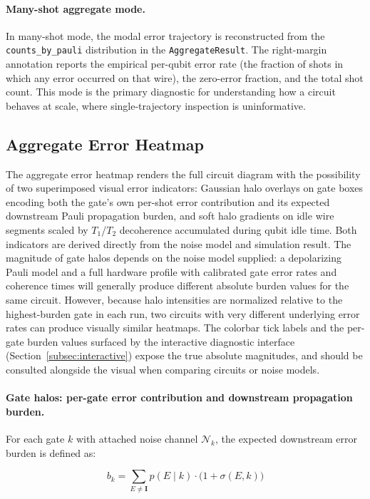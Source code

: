 \documentclass[10pt,twocolumn]{article}
\begin{document}
\paragraph{Many-shot aggregate mode.}
In many-shot mode, the modal error trajectory is reconstructed from
the \texttt{counts\_by\_pauli} distribution in the
\texttt{AggregateResult}.
The right-margin annotation reports the empirical per-qubit error rate
(the fraction of shots in which any error occurred on that wire), the
zero-error fraction, and the total shot count.
This mode is the primary diagnostic for understanding how a circuit
behaves at scale, where single-trajectory inspection is uninformative.

\subsection{Aggregate Error Heatmap}
\label{subsec:heatmap}

The aggregate error heatmap renders the full circuit diagram with
the possibility of two superimposed visual error indicators: Gaussian halo overlays on
gate boxes encoding both the gate's own per-shot error contribution
and its expected downstream Pauli propagation burden, and soft halo
gradients on idle wire segments scaled by $T_1$/$T_2$ decoherence
accumulated during qubit idle time.
Both indicators are derived directly from the noise model and
simulation result.
The magnitude of gate halos depends on the noise model supplied:
a depolarizing Pauli model and a full hardware profile with
calibrated gate error rates and coherence times will generally
produce different absolute burden values for the same circuit.
However, because halo intensities are normalized relative to the
highest-burden gate in each run, two circuits with very different
underlying error rates can produce visually similar heatmaps.
The colorbar tick labels and the per-gate burden values surfaced
by the interactive diagnostic interface
(Section~\ref{subsec:interactive}) expose the true absolute
magnitudes, and should be consulted alongside the visual when
comparing circuits or noise models.

\paragraph{Gate halos: per-gate error contribution and downstream
propagation burden.}
For each gate $k$ with attached noise channel $\mathcal{N}_k$, the
expected downstream error burden is defined as:

\begin{equation}
    b_k = \sum_{E \neq \mathbf{I}} p(E \mid k)
    \cdot \bigl(1 + \sigma(E, k)\bigr)
    \label{eq:burden}
\end{equation}
\end{document}

